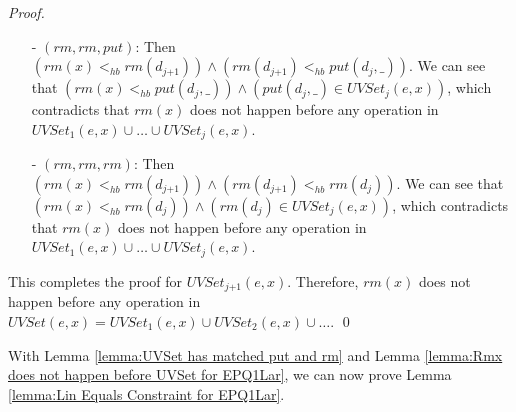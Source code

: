 \begin {proof}
\begin{itemize}
\begin{itemize}
    \item[-] If $\textit{put}(d_{\textit{ind}},\_) <_{hb} \textit{rm}(d_{\textit{ind-1}})$, then we obtain $T_{\textit{ind-1}}$, which already contain contradiction.
    \end{itemize}

    By base case $1$, base case $2$ and the induction step, it is easy to see that for each $i$, $T_i$ contains contradiction. Therefore, $T_j$, the case of $(\textit{rm},\textit{put},\textit{rm})$, contains contradiction.

\item[-] $(\textit{rm},\textit{rm},\textit{put})$: Then $( \textit{rm}(x) <_{hb} \textit{rm}(d_{\textit{j+1}}) ) \wedge ( \textit{rm}(d_{\textit{j+1}}) <_{hb} \textit{put}(d_j,\_) )$. We can see that $( \textit{rm}(x) <_{hb} \textit{put}(d_j,\_) ) \wedge ( \textit{put}(d_j,\_) \in \textit{UVSet}_j(e,x) )$, which contradicts that $\textit{rm}(x)$ does not happen before any operation in $\textit{UVSet}_1(e,x) \cup \ldots \cup \textit{UVSet}_j(e,x)$.

\item[-] $(\textit{rm},\textit{rm},\textit{rm})$: Then $( \textit{rm}(x) <_{hb} \textit{rm}(d_{\textit{j+1}}) ) \wedge ( \textit{rm}(d_{\textit{j+1}}) <_{hb} \textit{rm}(d_j) )$. We can see that $( \textit{rm}(x) <_{hb} \textit{rm}(d_j) ) \wedge ( \textit{rm}(d_j) \in \textit{UVSet}_j(e,x) )$, which contradicts that $\textit{rm}(x)$ does not happen before any operation in $\textit{UVSet}_1(e,x) \cup \ldots \cup \textit{UVSet}_j(e,x)$.
\end{itemize}

This completes the proof for $\textit{UVSet}_{\textit{j+1}}(e,x)$. Therefore, $\textit{rm}(x)$ does not happen before any operation in $\textit{UVSet}(e,x) = \textit{UVSet}_1(e,x) \cup \textit{UVSet}_2(e,x) \cup \ldots$. \qed
\end {proof}

With Lemma \ref{lemma:UVSet has matched put and rm} and Lemma \ref{lemma:Rmx does not happen before UVSet for EPQ1Lar}, we can now prove Lemma \ref{lemma:Lin Equals Constraint for EPQ1Lar}.

\LinEqualsConstraintforEPQOneLar*

